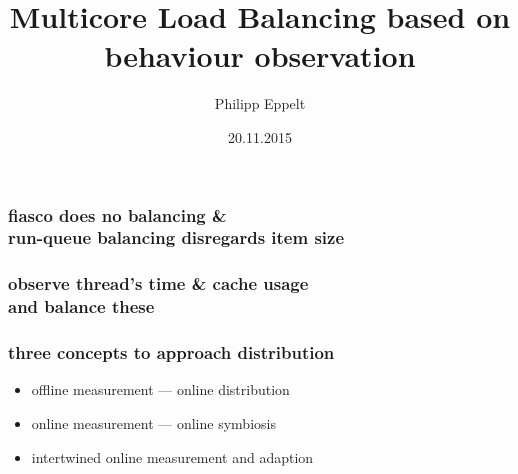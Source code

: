 \documentclass[utf8,10pt]{beamer}
\title[]{Multicore Load Balancing based on behaviour observation}
\author{Philipp Eppelt}
\date{20.11.2015}
\begin{document}
\maketitle

\large

\newcommand{\ft}[1]{\frametitle{\hfill #1}}


\begin{frame}
  \frametitle{fiasco does no balancing \& \\ run-queue balancing disregards
  item size}
  \centering
  \begin{minipage}[l]{.49\columnwidth}
    
  \end{minipage}
  \begin{minipage}[r]{.49\columnwidth}
    
  \end{minipage}
\end{frame}


\begin{frame}
  \frametitle{observe thread's time \& cache usage \\ and balance these}
  \centering
  \begin{minipage}[l]{.49\columnwidth}
    
  \end{minipage}
  \begin{minipage}[r]{.49\columnwidth}
    
  \end{minipage}
\end{frame}



\begin{frame}
  \frametitle{three concepts to approach distribution}
  \begin{itemize}
    \item offline measurement --- online distribution
    \item online measurement --- online symbiosis
       
    \item intertwined online measurement and adaption
       
  \end{itemize}
\end{frame}
\end{document}
